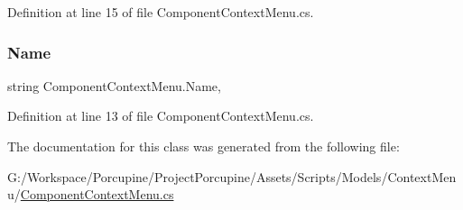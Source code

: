 Definition at line 15 of file Component\+Context\+Menu.\+cs.

\mbox{\label{class_component_context_menu_acc11a46dc7fdeb2fe9665a6ddbdd7fff}} 
\subsubsection{\texorpdfstring{Name}{Name}}
{\footnotesize\ttfamily string Component\+Context\+Menu.\+Name\hspace{0.3cm}{\ttfamily [get]}, {\ttfamily [set]}}



Definition at line 13 of file Component\+Context\+Menu.\+cs.



The documentation for this class was generated from the following file\+:\begin{DoxyCompactItemize}
\item 
G\+:/\+Workspace/\+Porcupine/\+Project\+Porcupine/\+Assets/\+Scripts/\+Models/\+Context\+Menu/\hyperlink{_component_context_menu_8cs}{Component\+Context\+Menu.\+cs}\end{DoxyCompactItemize}

